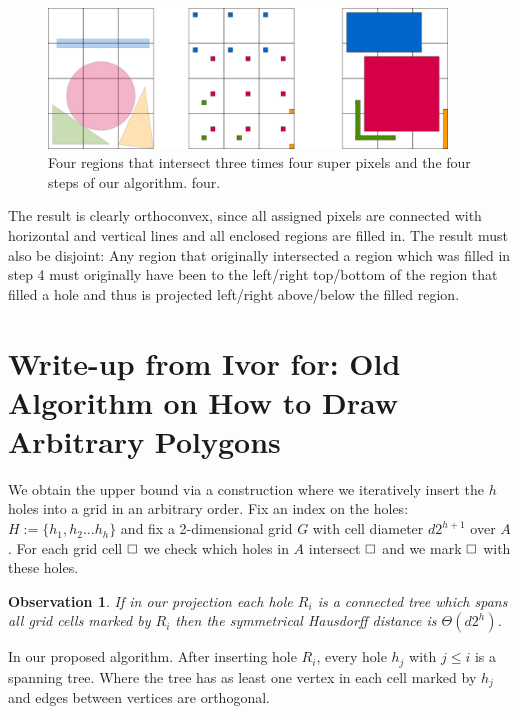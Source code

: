\documentclass[a4paper, UKenglish]{lipics-v2018}
\newtheorem{observation}{Observation}
\newcommand{\pix}{\square}
\begin{document}
\begin{figure}[H]
\centering
\includegraphics[width=400px]{Figures/convexprojection.png}
\caption{Four regions that intersect three times four super pixels and the four steps of our algorithm. four.}
\label{fig:convexprojection}
\end{figure}

The result is clearly orthoconvex, since all assigned pixels are connected with horizontal and vertical lines and all enclosed regions are filled in. The result must also be disjoint: Any region that originally intersected a region which was filled in step 4 must originally have been to the left/right top/bottom of the region that filled a hole and thus is projected left/right above/below the filled region.



\section{Write-up from Ivor for: Old Algorithm on How to Draw Arbitrary Polygons}



We obtain the upper bound via a construction where we iteratively insert the $h$ holes into a grid in an arbitrary order.
Fix an index on the holes: $H := \{ h_1, h_2 ... h_h \}$ and fix a 2-dimensional grid $G$ with cell diameter $ d 2^{h+1}$ over $A$.
For each grid cell $\hfill\pix$ we check which holes in $A$ intersect $\hfill\pix$ and we mark $\hfill\pix$ with these holes.

\begin{observation}
If in our projection each hole $R_i$ is a connected tree which spans all grid cells marked by $R_i$ then the symmetrical Hausdorff distance is $\Theta(d2^h)$.
\end{observation}

\begin{definition}
In our proposed algorithm. After inserting hole $R_i$, every hole $h_j$ with $j \le i$ is a spanning tree. Where the tree has as least one vertex in each cell marked by $h_j$ and edges between vertices are orthogonal.
\end{definition}
\end{document}
